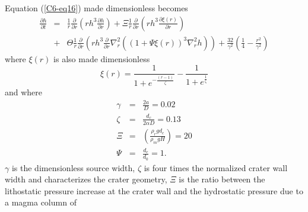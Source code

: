 Equation (\ref{C6-eq16}) made dimensionless becomes
\begin{eqnarray}    \frac{\partial     h}{\partial    t}&=&\frac{1}{r}
  \frac{\partial}{\partial r}\left  (rh^{3} \frac{\partial h}{\partial
      r} \right)+ \Xi \frac{1}{r} \frac{\partial}{\partial r}\left
                                                            (   rh^{3}\frac{\partial    \xi(r)}{\partial   r}\right   )\nonumber\\
                                                        &+&\Theta
                                                            \frac{1}{r}\frac{\partial}{\partial
                                                            r}\left
                                                            (   rh^{3}
                                                            \frac{\partial}{\partial
                                                            r}
                                                            \nabla^{2}_{r}\left
                                                            ((1+\Psi
                                                            \xi(r))^{3}\nabla^{2}_{r}h
                                                            \right )\right)+
                                                            \frac{32}{\gamma^{2}}
                                                            \left(\frac{1}{4}-\frac{r^{2}}{\gamma^{2}}\right)
                                                            \label{C6-eq21}
\end{eqnarray}
where $\xi(r)$ is also made dimensionless
\begin{equation}
  \xi(r)=\frac{1}{1+e^{-\frac{(r-1)}{\zeta}}}-\frac{1}{1+e^{\frac{1}{\zeta}}}\label{C6-eqqqq}
\end{equation}
and where
\begin{eqnarray}
  \label{C6-Dimensionless1} 
  \gamma&=&\frac{2a}{D}= 0.02\label{C6-n1}\\
  \zeta&=&\frac{d_c}{2\alpha D}=0.13
           \label{C6-n2}\\ \Xi&=&
                               \left(\frac{\rho_{r}gd_{c}}{\rho_{m}gH}\right )
                               = 20 \label{C6-n3}\\
  \Psi&=&\frac{d_{c}}{d_0} = 1\label{C6-n4}. 
\end{eqnarray}
$\gamma$ is the dimensionless source  width, $\zeta$ is four times the
normalized crater  wall width  and characterizes the  crater geometry,
$\Xi$ is  the ratio between  the lithostatic pressure increase  at the
crater wall  and the  hydrostatic pressure  due to  a magma  column of
